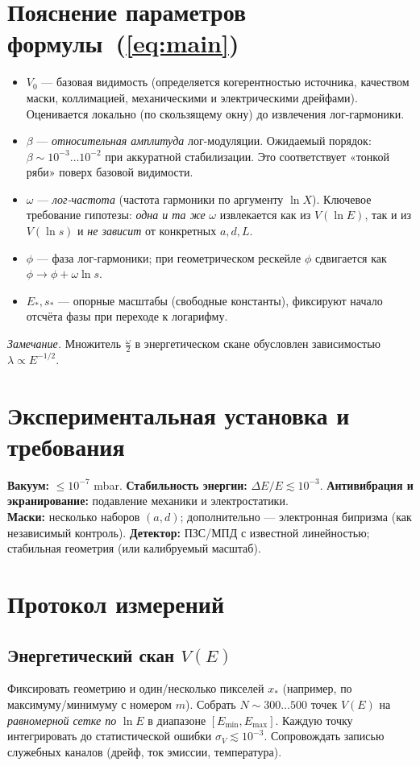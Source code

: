 \documentclass[a4paper,12pt]{article}
\begin{document}
\section{Пояснение параметров формулы~(\ref{eq:main})}
\begin{itemize}
\item \textbf{$V_0$} --- базовая видимость (определяется когерентностью источника, качеством маски, коллимацией,
механическими и электрическими дрейфами). Оценивается локально (по скользящему окну) до извлечения лог-гармоники.
\item \textbf{$\beta$} --- \emph{относительная амплитуда} лог-модуляции. Ожидаемый порядок: $\beta\sim10^{-3}\ldots10^{-2}$
при аккуратной стабилизации. Это соответствует «тонкой ряби» поверх базовой видимости.
\item \textbf{$\omega$} --- \emph{лог-частота} (частота гармоники по аргументу $\ln X$). Ключевое требование гипотезы:
\emph{одна и та же} $\omega$ извлекается как из $V(\ln E)$, так и из $V(\ln s)$ и \emph{не зависит} от конкретных $a,d,L$.
\item \textbf{$\phi$} --- фаза лог-гармоники; при геометрическом рескейле $\phi$ сдвигается как $\phi\to\phi+\omega\ln s$.
\item \textbf{$E_{\ast}, s_{\ast}$} --- опорные масштабы (свободные константы), фиксируют начало отсчёта фазы при переходе к логарифму.
\end{itemize}
\noindent
\textit{Замечание.} Множитель $\tfrac{\omega}{2}$ в энергетическом скане обусловлен зависимостью
$\lambda\propto E^{-1/2}$.

\section{Экспериментальная установка и требования}
\textbf{Вакуум:} $\le 10^{-7}$ mbar. \quad
\textbf{Стабильность энергии:} $\Delta E/E\lesssim10^{-3}$. \quad
\textbf{Антивибрация и экранирование:} подавление механики и электростатики.\\
\textbf{Маски:} несколько наборов $(a,d)$; дополнительно --- электронная бипризма (как независимый контроль).
\textbf{Детектор:} ПЗС/МПД с известной линейностью; стабильная геометрия (или калибруемый масштаб).

\section{Протокол измерений}
\subsection{Энергетический скан $V(E)$}
Фиксировать геометрию и один/несколько пикселей $x_{\ast}$ (например, по максимуму/минимуму с номером $m$).
Собрать $N\sim 300\ldots 500$ точек $V(E)$ на \emph{равномерной сетке по} $\ln E$ в диапазоне $[E_{\min},E_{\max}]$.
Каждую точку интегрировать до статистической ошибки $\sigma_V\lesssim10^{-3}$. Сопровождать записью служебных каналов
(дрейф, ток эмиссии, температура).
\end{document}
